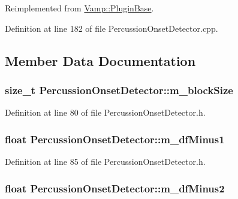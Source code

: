 Reimplemented from \hyperlink{class_vamp_1_1_plugin_base_a6c718ce822f7b73b98940d59dcaa9366}{Vamp\+::\+Plugin\+Base}.



Definition at line 182 of file Percussion\+Onset\+Detector.\+cpp.



\subsection{Member Data Documentation}
\subsubsection[{\texorpdfstring{m\+\_\+block\+Size}{m_blockSize}}]{\setlength{\rightskip}{0pt plus 5cm}size\+\_\+t Percussion\+Onset\+Detector\+::m\+\_\+block\+Size\hspace{0.3cm}{\ttfamily [protected]}}\hypertarget{class_percussion_onset_detector_a920de543dbcf70a2edd80b5b31313285}{}\label{class_percussion_onset_detector_a920de543dbcf70a2edd80b5b31313285}


Definition at line 80 of file Percussion\+Onset\+Detector.\+h.

\subsubsection[{\texorpdfstring{m\+\_\+df\+Minus1}{m_dfMinus1}}]{\setlength{\rightskip}{0pt plus 5cm}float Percussion\+Onset\+Detector\+::m\+\_\+df\+Minus1\hspace{0.3cm}{\ttfamily [protected]}}\hypertarget{class_percussion_onset_detector_acd80162c65212be7fa91251263fb9c3d}{}\label{class_percussion_onset_detector_acd80162c65212be7fa91251263fb9c3d}


Definition at line 85 of file Percussion\+Onset\+Detector.\+h.

\subsubsection[{\texorpdfstring{m\+\_\+df\+Minus2}{m_dfMinus2}}]{\setlength{\rightskip}{0pt plus 5cm}float Percussion\+Onset\+Detector\+::m\+\_\+df\+Minus2\hspace{0.3cm}{\ttfamily [protected]}}\hypertarget{class_percussion_onset_detector_a6ad7d8353cc681ff42a63b127cca5779}{}\label{class_percussion_onset_detector_a6ad7d8353cc681ff42a63b127cca5779}


